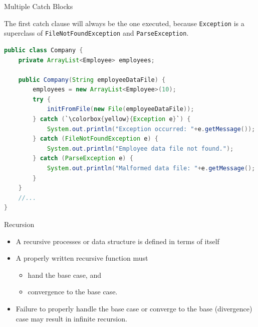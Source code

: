 \documentclass{beamer}
\begin{document}
\begin{frame}[fragile]{Multiple Catch Blocks}


The first catch clause will always be the one executed, because {\tt Exception} is a superclass of {\tt FileNotFoundException} and {\tt ParseException}.
\begin{lstlisting}[language=Java,escapechar=`]
public class Company {
    private ArrayList<Employee> employees;

    public Company(String employeeDataFile) {
        employees = new ArrayList<Employee>(10);
        try {
            initFromFile(new File(employeeDataFile));
        } catch (`\colorbox{yellow}{Exception e}`) {
            System.out.println("Exception occurred: "+e.getMessage());
        } catch (FileNotFoundException e) {
            System.out.println("Employee data file not found.");
        } catch (ParseException e) {
            System.out.println("Malformed data file: "+e.getMessage();
        }
    }
    //...
}

\end{lstlisting}

\end{frame}

\begin{frame}[fragile]{Recursion}


\begin{itemize}
\item A recursive processes or data structure is defined in terms of itself
\item A properly written recursive function must
\begin{itemize}
\item hand the base case, and
\item convergence to the base case.
\end{itemize}
\item Failure to properly handle the base case or converge to the base (divergence) case may result in infinite recursion.
\end{itemize}


\end{frame}
\end{document}
